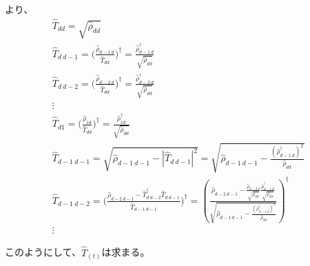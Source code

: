 \documentclass[11pt,a4j,notitlepage]{jreport}
\begin{document}
	より、
	\begin{equation*}
		\begin{gathered}
			\hat{T}_{dd} = \sqrt{\hat{\rho}_{dd}} \\
			\hat{T}_{d\ d-1} = \Big( \frac{\hat{\rho}_{d-1\ d}}{\hat{T}_{dd}} \Big)^\dagger = \frac{\hat{\rho}_{d-1\ d}^\dagger}{\sqrt{\hat{\rho}_{dd}}} \\
			\hat{T}_{d\ d-2} = \Big( \frac{\hat{\rho}_{d-2\ d}}{\hat{T}_{dd}} \Big)^\dagger = \frac{\hat{\rho}_{d-2\ d}^\dagger}{\sqrt{\hat{\rho}_{dd}}} \\
			\vdots \\
			\hat{T}_{d1} = \Big( \frac{\hat{\rho}_{1d}}{\hat{T}_{dd}} \Big)^\dagger = \frac{\hat{\rho}_{1d}^\dagger}{\sqrt{\hat{\rho}_{dd}}} \\
			\hat{T}_{d-1\ d-1} = \sqrt{\hat{\rho}_{d-1\ d-1} - | \hat{T}_{d\ d-1} |^2} = \sqrt{\hat{\rho}_{d-1\ d-1} - \frac{(\hat{\rho}_{d-1\ d}^\dagger)^2}{\hat{\rho}_{dd}}} \\
			\hat{T}_{d-1\ d-2} = \Bigg(\frac{\hat{\rho}_{d-2\ d-1} - \hat{T}_{d\ d-2}^\dagger \hat{T}_{d\ d-1}}{\hat{T}_{d-1\ d-1}} \Bigg)^\dagger = \left( \frac{\hat{\rho}_{d-2\ d-1} - \frac{\hat{\rho}_{d-2\ d}}{\sqrt{\hat{\rho}_{dd}}} \frac{\hat{\rho}_{d-1\ d}^\dagger}{\sqrt{\hat{\rho}_{dd}}}}{\sqrt{\hat{\rho}_{d-1\ d-1} - \frac{(\hat{\rho}_{d-1\ d}^\dagger)^2 }{\hat{\rho}_{dd}}}} \right)^\dagger \\
			\vdots
		\end{gathered}
	\end{equation*}

	このようにして、$\hat{T}_{(t)}$は求まる。
\end{document}
